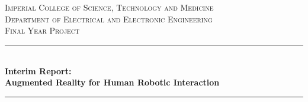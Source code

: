 \documentclass[12pt,a4paper]{report}
\begin{document}
\begin{titlepage}


\newcommand{\HRule}{\rule{\linewidth}{0.5mm}} %
\setlength{\topmargin}{0in}
\center %
 
\vspace*{-3cm}
 
\begin{minipage}{0.4\textwidth}
\begin{flushleft} \large
\hspace*{-0.5cm}
\end{flushleft}
\end{minipage}
~
\begin{minipage}{0.5\textwidth}
\begin{flushright} \large
\hspace*{2cm}
\end{flushright}
\end{minipage}\\[1cm]

\textsc{\LARGE Imperial College of Science, Technology and Medicine}\\[1.5cm] %
\textsc{\Large Department of Electrical and Electronic Engineering}\\[0.8cm] %
\textsc{\Large  Final Year Project}\\[0.8cm] %


\addvspace{1.8em}

\HRule \\[0.2cm]
{ \huge \bfseries Interim Report:\\ Augmented Reality for Human Robotic Interaction }\\[0.2cm] %
\HRule \\[1cm]
 

\end{titlepage}
\end{document}
